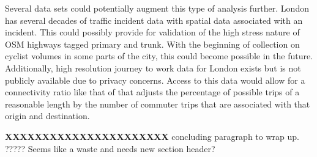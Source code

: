 Several data sets could potentially augment this type of analysis further. London has several decades of traffic incident data with spatial data associated with an incident. This could possibly provide for validation of the high stress nature of OSM highways tagged primary and trunk. With the beginning of collection on cyclist volumes in some parts of the city, this could become possible in the future.  Additionally, high resolution journey to work data for London exists but is not publicly available due to privacy concerns. Access to this data would allow for a connectivity ratio like that of \textcite{furth2016network} that adjusts the percentage of possible trips of a reasonable length by the number of commuter trips that are associated with that origin and destination. 

\textbf{XXXXXXXXXXXXXXXXXXXXXX} 
concluding paragraph to wrap up. ????? Seems like a waste and needs new section header? 
 